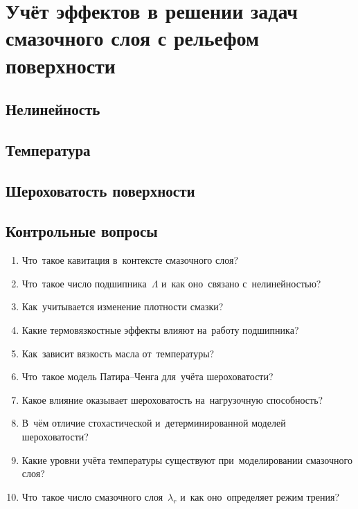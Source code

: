 \chapter{Учёт эффектов в решении задач смазочного слоя с рельефом поверхности}

\section{Нелинейность}


\FloatBarrier
\section{Температура}


\FloatBarrier
\section{Шероховатость поверхности}


% 

\FloatBarrier
\section*{Контрольные вопросы}

\begin{enumerate}
\item Что~такое кавитация в~контексте смазочного слоя?
\item Что~такое число подшипника~$\Lambda$ и~как оно~связано с~нелинейностью?
\item Как~учитывается изменение плотности смазки?
\item Какие термовязкостные эффекты влияют на~работу подшипника?
\item Как~зависит вязкость масла от~температуры?
\item Что~такое модель Патира--Ченга для~учёта шероховатости?
\item Какое влияние оказывает шероховатость на~нагрузочную способность?
\item В~чём отличие стохастической и~детерминированной моделей шероховатости?
\item Какие уровни учёта температуры существуют при~моделировании смазочного слоя?
\item Что~такое число смазочного слоя~$\lambda_r$ и~как оно~определяет режим трения?
\end{enumerate}
